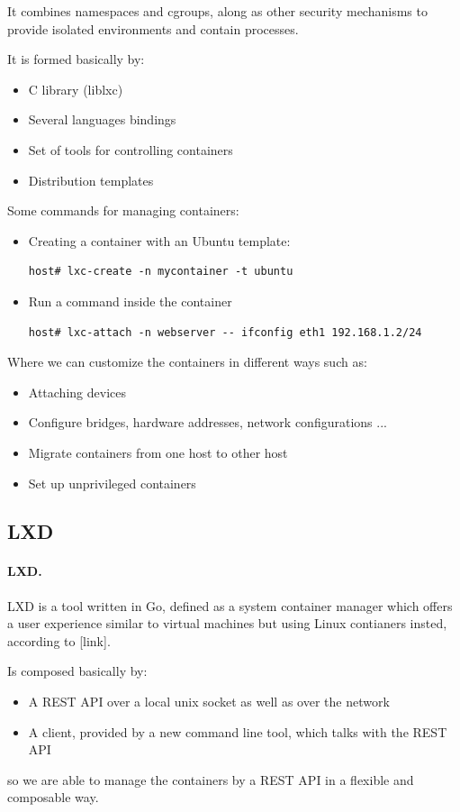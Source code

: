 It combines namespaces and cgroups, along as other security mechanisms to provide isolated environments and contain processes.

It is formed basically by:
\begin{itemize}
	\item{C library (liblxc)}
	\item{Several languages bindings}
	\item{Set of tools for controlling containers}
	\item{Distribution templates}
\end{itemize}

Some commands for managing containers:
\begin{itemize}
	\item{Creating a container with an Ubuntu template}:
	      \begin{verbatim}
host# lxc-create -n mycontainer -t ubuntu
	\end{verbatim}
	\item{Run a command inside the container}
	      \begin{verbatim}
host# lxc-attach -n webserver -- ifconfig eth1 192.168.1.2/24
	\end{verbatim}
\end{itemize}

Where we can customize the containers in different ways such as:
\begin{itemize}
	\item{Attaching devices}
	\item{Configure bridges, hardware addresses, network configurations ...}
	\item{Migrate containers from one host to other host}
	\item{Set up unprivileged containers}
\end{itemize}

\subsection{LXD}
\paragraph{LXD.} LXD is a tool written in Go, defined as a system container manager which offers a user experience similar to virtual machines but using Linux contianers insted, according to [link].

Is composed basically by:
\begin{itemize}
	\item{A REST API over a local unix socket as well as over the network}
	\item{A client, provided by a new command line tool, which talks with the REST API}
\end{itemize}
so we are able to manage the containers by a REST API in a flexible and composable way.

